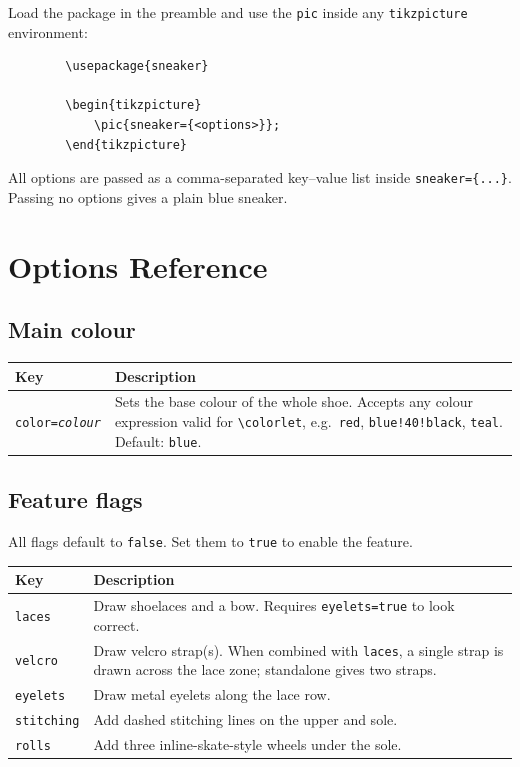 \documentclass[a4paper, 11pt]{article}
\newcommand{\meta}[1]{\textlangle\textit{#1}\textrangle}
\begin{document}
	Load the package in the preamble and use the \texttt{pic} inside any
	\texttt{tikzpicture} environment:
	
	\begin{lstlisting}
		\usepackage{sneaker}
		
		\begin{tikzpicture}
			\pic{sneaker={<options>}};
		\end{tikzpicture}
	\end{lstlisting}
	
	All options are passed as a comma-separated key--value list inside
	\verb|sneaker={...}|. Passing no options gives a plain blue sneaker.
	
	\section{Options Reference}
	
	\subsection{Main colour}
	
	\begin{tabular}{@{}lp{8.5cm}@{}}
		\toprule
		Key & Description \\
		\midrule
		\texttt{color=\meta{colour}} &
		Sets the base colour of the whole shoe. Accepts any colour
		expression valid for \verb|\colorlet|, e.g.\ \texttt{red},
		\texttt{blue!40!black}, \texttt{teal}.
		Default: \texttt{blue}. \\
		\bottomrule
	\end{tabular}
	
	\subsection{Feature flags}
	
	All flags default to \texttt{false}. Set them to \texttt{true} to
	enable the feature.
	
	\begin{tabular}{@{}lp{8.5cm}@{}}
		\toprule
		Key & Description \\
		\midrule
		\texttt{laces}    & Draw shoelaces and a bow.
		Requires \texttt{eyelets=true} to look correct. \\
		\texttt{velcro}   & Draw velcro strap(s). When combined with
		\texttt{laces}, a single strap is drawn across
		the lace zone; standalone gives two straps. \\
		\texttt{eyelets}  & Draw metal eyelets along the lace row. \\
		\texttt{stitching}& Add dashed stitching lines on the upper and sole. \\
		\texttt{rolls}    & Add three inline-skate-style wheels under the sole. \\
		\bottomrule
	\end{tabular}
	
\end{document}
